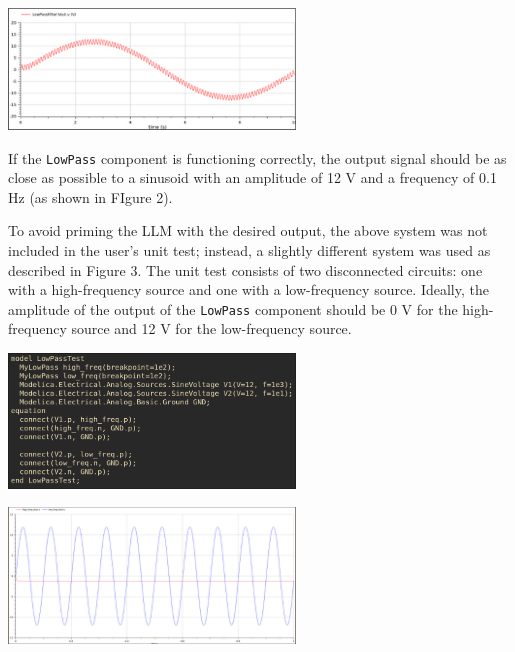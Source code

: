 \documentclass[11pt]{article}
\begin{document}
\begin{center}
\includegraphics[width=3in]{./images/passive_lowpass_desired_output.png}
\end{center}

If the \texttt{LowPass} component is functioning correctly, the output signal should be as close as possible to a sinusoid with an amplitude of 12 V and a frequency of 0.1 Hz (as shown in FIgure 2).

To avoid priming the LLM with the desired output, the above system was not included in the user's unit test; instead, a slightly different system was used as described in Figure 3. The unit test consists of two disconnected circuits: one with a high-frequency source and one with a low-frequency source. Ideally, the amplitude of the output of the \texttt{LowPass} component should be 0 V for the high-frequency source and 12 V for the low-frequency source.

\begin{center}
\includegraphics[width=3in]{./images/passive_lowpass_unit_test.png}
\end{center}

\begin{center}
\includegraphics[width=3in]{./images/passive_lowpass_unit_test_output.png}
\end{center}
\end{document}

